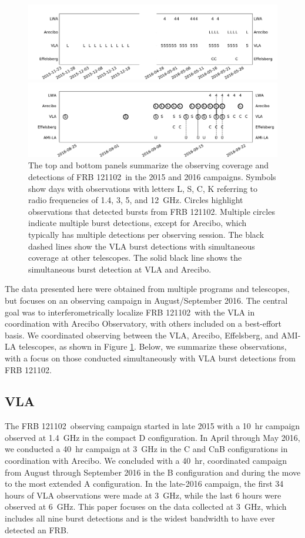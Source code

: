 \documentclass[twocolumn]{aastex61}
\newcommand{\frb}{FRB 121102}
\begin{document}
\begin{figure}[t]
\begin{center}
\includegraphics[width=2\columnwidth]{timeline0}

\includegraphics[width=2\columnwidth]{timeline}
\caption{The top and bottom panels summarize the observing coverage and detections of \frb\ in the 2015 and 2016 campaigns. Symbols show days with observations with letters L, S, C, K referring to radio frequencies of 1.4, 3, 5, and 12~GHz. Circles highlight observations that detected bursts from \frb. Multiple circles indicate multiple burst detections, except for Arecibo, which typically has multiple detections per observing session. The black dashed lines show the VLA burst detections with simultaneous coverage at other telescopes. The solid black line shows the simultaneous burst detection at VLA and Arecibo.
\label{fig:multi}}
\end{center}
\end{figure}

The data presented here were obtained from multiple programs and telescopes, but focuses on an observing campaign in August/September 2016. The central goal was to interferometrically localize \frb\ with the VLA in coordination with Arecibo Observatory, with others included on a best-effort basis. We coordinated observing between the VLA, Arecibo, Effelsberg, and AMI-LA telescopes, as shown in Figure \ref{fig:multi}. Below, we summarize these observations, with a focus on those conducted simultaneously with VLA burst detections from \frb.

\subsection{VLA}
The \frb\ observing campaign started in late 2015 with a 10~hr campaign observed at 1.4~GHz in the compact D configuration. In April through May 2016, we conducted a 40~hr campaign at 3~GHz in the C and CnB configurations in coordination with Arecibo. We concluded with a 40~hr, coordinated campaign from August through September 2016 in the B configuration and during the move to the most extended A configuration. In the late-2016 campaign, the first 34 hours of VLA observations were made at 3~GHz, while the last 6 hours were observed at 6~GHz. This paper focuses on the data collected at 3~GHz, which includes all nine burst detections and is the widest bandwidth to have ever detected an FRB.
\end{document}
